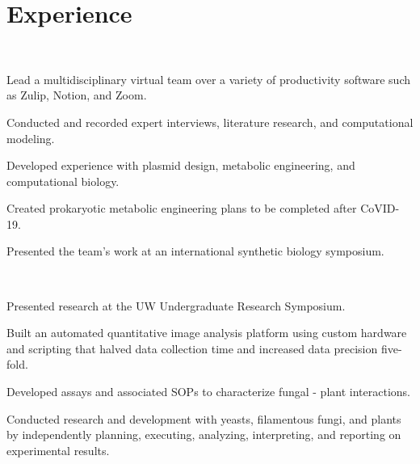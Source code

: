 \documentclass[]{forrest-resume-interfont}
\begin{document}
\section{ Experience}
\\

\begin{tightemize}
    \item Lead a multidisciplinary virtual team over a variety of productivity software such as Zulip, Notion, and Zoom.
    \item Conducted and recorded expert interviews, literature research, and computational modeling.
    \item Developed experience with plasmid design, metabolic engineering, and computational biology.
    \item Created prokaryotic metabolic engineering plans to be completed after CoVID-19.
    \item Presented the team's work at an international synthetic biology symposium.
\end{tightemize}


\sectionsep


\\

\begin{tightemize}
    \item Presented research at the UW Undergraduate Research Symposium.
    \item Built an automated quantitative image analysis platform using custom hardware and scripting that halved data collection time and increased data precision five-fold.
    \item Developed assays and associated SOPs to characterize fungal - plant interactions.
    \item Conducted research and development with yeasts, filamentous fungi, and plants by independently planning, executing, analyzing, interpreting, and reporting on experimental results. 
\end{tightemize}


\end{document}
